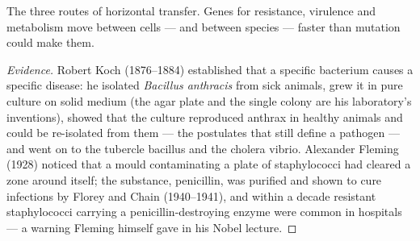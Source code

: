 \begin{omfigure}

{\small The three routes of horizontal transfer. Genes for resistance,
virulence and metabolism move between cells --- and between species ---
faster than mutation could make them.}
\end{omfigure}

\begin{proof}[Evidence]
Robert Koch (1876--1884) established that a specific bacterium causes a
specific disease: he isolated \emph{Bacillus anthracis} from sick
animals, grew it in pure culture on solid medium (the agar plate and
the single colony are his laboratory's inventions), showed that the
culture reproduced anthrax in healthy animals and could be re-isolated
from them --- the postulates that still define a pathogen --- and went
on to the tubercle bacillus and the cholera vibrio. Alexander Fleming
(1928) noticed that a mould contaminating a plate of staphylococci had
cleared a zone around itself; the substance, penicillin, was purified
and shown to cure infections by Florey and Chain (1940--1941), and
within a decade resistant staphylococci carrying a penicillin-destroying
enzyme were common in hospitals --- a warning Fleming himself gave in
his Nobel lecture.
\end{proof}

